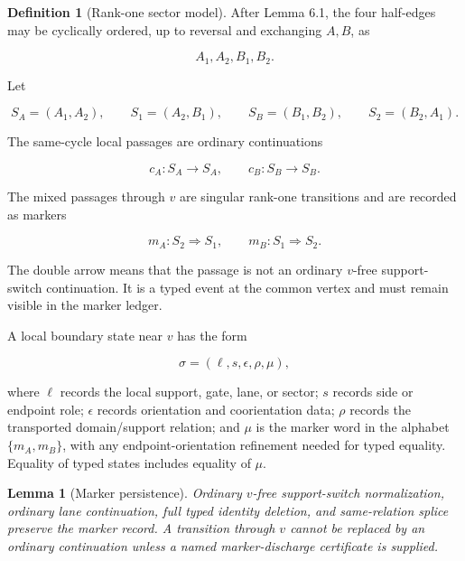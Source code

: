 \documentclass[11pt]{amsart}
\newtheorem{lemma}[theorem]{Lemma}
\theoremstyle{definition}
\newtheorem{definition}[theorem]{Definition}
\begin{document}
\begin{definition}[Rank-one sector model]
After Lemma 6.1, the four half-edges may be cyclically ordered, up to reversal and exchanging \(A,B\), as

\[
A_1,A_2,B_1,B_2.
\]

Let

\[
S_A=(A_1,A_2),\qquad
S_1=(A_2,B_1),\qquad
S_B=(B_1,B_2),\qquad
S_2=(B_2,A_1).
\]

The same-cycle local passages are ordinary continuations

\[
c_A:S_A\to S_A,\qquad c_B:S_B\to S_B.
\]

The mixed passages through \(v\) are singular rank-one transitions and are recorded as markers

\[
m_A:S_2\Rightarrow S_1,\qquad
m_B:S_1\Rightarrow S_2.
\]

The double arrow means that the passage is not an ordinary \(v\)-free support-switch continuation. It is a typed event at the common vertex and must remain visible in the marker ledger.

A local boundary state near \(v\) has the form

\[
\sigma=(\ell,s,\epsilon,\rho,\mu),
\]

where \(\ell\) records the local support, gate, lane, or sector; \(s\) records side or endpoint role; \(\epsilon\) records orientation and coorientation data; \(\rho\) records the transported domain/support relation; and \(\mu\) is the marker word in the alphabet \(\{m_A,m_B\}\), with any endpoint-orientation refinement needed for typed equality. Equality of typed states includes equality of \(\mu\).

\end{definition}
\begin{lemma}[Marker persistence]
Ordinary \(v\)-free support-switch normalization, ordinary lane continuation, full typed identity deletion, and same-relation splice preserve the marker record. A transition through \(v\) cannot be replaced by an ordinary continuation unless a named marker-discharge certificate is supplied.

\end{lemma}
\end{document}
